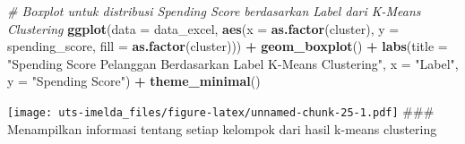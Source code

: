 \documentclass[
]{article}
\newenvironment{Shaded}{\begin{snugshade}}{\end{snugshade}}
\newcommand{\AttributeTok}[1]{\textcolor[rgb]{0.13,0.29,0.53}{#1}}
\newcommand{\CommentTok}[1]{\textcolor[rgb]{0.56,0.35,0.01}{\textit{#1}}}
\newcommand{\ControlFlowTok}[1]{\textcolor[rgb]{0.13,0.29,0.53}{\textbf{#1}}}
\newcommand{\FunctionTok}[1]{\textcolor[rgb]{0.13,0.29,0.53}{\textbf{#1}}}
\newcommand{\NormalTok}[1]{#1}
\newcommand{\OtherTok}[1]{\textcolor[rgb]{0.56,0.35,0.01}{#1}}
\newcommand{\SpecialCharTok}[1]{\textcolor[rgb]{0.81,0.36,0.00}{\textbf{#1}}}
\newcommand{\StringTok}[1]{\textcolor[rgb]{0.31,0.60,0.02}{#1}}
\begin{document}
\begin{Shaded}
\begin{Highlighting}[]
\CommentTok{\# Boxplot untuk distribusi Spending Score berdasarkan Label dari K{-}Means Clustering}
\FunctionTok{ggplot}\NormalTok{(}\AttributeTok{data =}\NormalTok{ data\_excel, }\FunctionTok{aes}\NormalTok{(}\AttributeTok{x =} \FunctionTok{as.factor}\NormalTok{(cluster), }\AttributeTok{y =}\NormalTok{ spending\_score, }\AttributeTok{fill =} \FunctionTok{as.factor}\NormalTok{(cluster))) }\SpecialCharTok{+}
  \FunctionTok{geom\_boxplot}\NormalTok{() }\SpecialCharTok{+}
  \FunctionTok{labs}\NormalTok{(}\AttributeTok{title =} \StringTok{"Spending Score Pelanggan Berdasarkan Label K{-}Means Clustering"}\NormalTok{, }
       \AttributeTok{x =} \StringTok{"Label"}\NormalTok{, }\AttributeTok{y =} \StringTok{"Spending Score"}\NormalTok{) }\SpecialCharTok{+}
  \FunctionTok{theme\_minimal}\NormalTok{()}
\end{Highlighting}
\end{Shaded}

\texttt{[image: uts-imelda\_files/figure-latex/unnamed-chunk-25-1.pdf]}
\#\#\# Menampilkan informasi tentang setiap kelompok dari hasil k-means
clustering

\begin{Shaded}
\end{Shaded}
\end{document}
